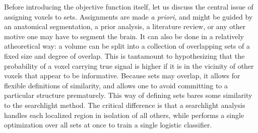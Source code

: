 Before introducing the objective function itself, let us discuss the central issue of assigning voxels to sets. Assignments are made {\em a priori}, and might be guided by an anatomical segmentation, a prior analysis, a literature review, or any other motive one may have to segment the brain. It can also be done in a relatively atheoretical way: a volume can be split into a collection of overlapping sets of a fixed size and degree of overlap. This is tantamount to hypothesizing that the probability of a voxel carrying true signal is higher if it is in the vicinity of other voxels that appear to be informative. Because sets may overlap, it allows for flexible definitions of similarity, and allows one to avoid committing to a particular structure prematurely. This way of defining sets bares some similarity to the searchlight method. The critical difference is that a searchlight analysis handles each localized region in isolation of all others, while {\soslasso} performs a single optimization over all sets at once to train a single logistic classifier.



